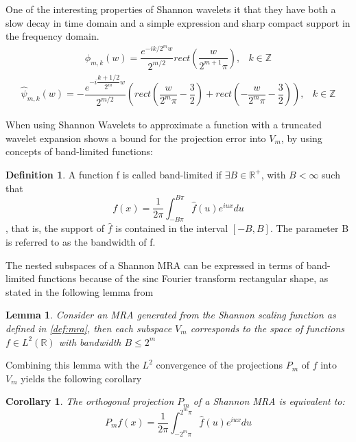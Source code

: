 \documentclass[12,twoside]{mammeTFM}
\newtheorem{lem}[thm]{Lemma}
\newtheorem{cor}[thm]{Corollary}
\theoremstyle{definition}
\newtheorem{definition}[thm]{Definition}
\theoremstyle{remark}
\newcommand{\Z}{\ensuremath{\mathbb{Z}}}
\newcommand{\R}{\ensuremath{\mathbb{R}}}
\begin{document}
One of the interesting properties of Shannon wavelets it that they have both a slow decay in time domain and a simple expression and sharp compact support in the frequency domain.
\begin{equation} \label{eq:sharp_freq}
\begin{array}{rcl}
\hat{\phi}_{m,k}(w) = \dfrac{e^{-i k/2^m w}}{2^{m/2}}rect \left(\dfrac{w}{2^{m+1}\pi}\right), & k \in \Z
\end{array}
\end{equation}
\begin{equation}
\begin{array}{rcl}
\hat{\psi}_{m,k}(w) = -\dfrac{e^{-i \dfrac{k + 1/2}{2^m} w}}{2^{m/2}} \left(rect \left(\dfrac{w}{2^{m}\pi} - \dfrac{3}{2}\right) + rect \left(-\dfrac{w}{2^{m}\pi} - \dfrac{3}{2}\right) \right), & k \in \Z
\end{array}
\end{equation}

When using Shannon Wavelets to approximate a function with a truncated wavelet expansion \cite{mar17} shows a bound for the projection error into $V_m$, by using concepts of band-limited functions:

\begin{definition} A function f is called band-limited if $\exists B \in \R^+$, with $B < \infty$ such that
\begin{equation}
f(x) = \dfrac{1}{2\pi} \int_{-B \pi}^{B \pi} \hat{f}(u) e^{iu x}du 
\end{equation}
, that is, the support of $\hat{f}$ is contained in the interval $[-B, B]$. The parameter B is referred to as the bandwidth of f.
\end{definition}

The nested subspaces of a Shannon MRA can be expressed in terms of band-limited functions because of the sinc Fourier transform rectangular shape, as stated in the following lemma from \cite{ste11}

\begin{lem} Consider an MRA generated from the Shannon scaling function as defined in \ref{def:mra}, then each subspace $V_m$ corresponds to the space of functions $f \in L^2(\R)$ with bandwidth $B \leq 2^m$
\end{lem}

Combining this lemma with the $L^2$ convergence of the projections $P_m$ of $f$ into $V_m$ yields the following corollary \cite{mar17}

\begin{cor} The orthogonal projection $P_m$ of a Shannon MRA is equivalent to:
\begin{equation}
P_m f(x) = \dfrac{1}{2 \pi} \int_{-2^m \pi}^{2^m \pi} \hat{f}(u) e^{i u x} d u
\end{equation}
\end{cor}
\end{document}

